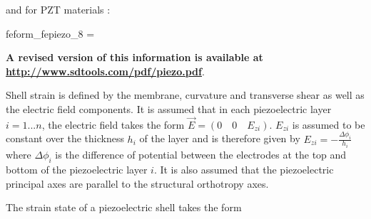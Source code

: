 \begin{SDT}
and for PZT materials :

\begin{eqsvg}{feform_fepiezo_8}
  = 
 \end{eqsvg}



{\bf A revised version of this information is available at \url{http://www.sdtools.com/pdf/piezo.pdf}}. 

 
Shell strain is defined by the membrane, curvature and transverse shear as well as the electric field components. It is assumed that
in each piezoelectric layer $i=1...n$, the electric field takes
the form $\vec{E}= (0 \quad 0 \quad E_{zi})$. $E_{zi}$ is assumed
to be constant over the thickness $h_i$ of the layer and is
therefore given by $E_{zi}=-\frac{\Delta \phi_i}{h_i}$ where
$\Delta \phi_i$ is the difference of potential between the
electrodes at the top and bottom of the piezoelectric layer $i$.
It is also assumed that the piezoelectric principal axes are
parallel to the structural orthotropy axes.

\begin{figure}[H]
\centering
{}
\end{figure}

The strain state of a piezoelectric shell takes the form


\end{SDT}
